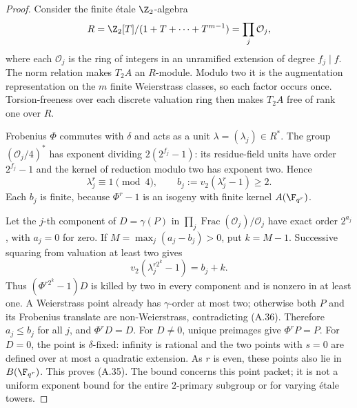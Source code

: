 \begin{proof}
Consider the finite \'etale $\Z_2$-algebra
\[
 R=\Z_2[T]/(1+T+\cdots+T^{m-1})
       =\prod_j\mathcal O_j,
\]
where each $\mathcal O_j$ is the ring of integers in
an unramified extension of degree $f_j\mid f$.
The norm relation makes $T_2A$ an $R$-module.
Modulo two it is the augmentation representation on
the $m$ finite Weierstrass classes, so each factor
occurs once. Torsion-freeness over each discrete
valuation ring then makes $T_2A$ free of rank one
over $R$.

Frobenius $\Phi$ commutes with $\delta$ and acts as a
unit $\lambda=(\lambda_j)\in R^*$. The group
$(\mathcal O_j/4)^*$ has exponent dividing
$2(2^{f_j}-1)$: its residue-field units have order
$2^{f_j}-1$ and the kernel of reduction modulo two
has exponent two. Hence
\[
 \lambda_j^r\equiv1\pmod4,
 \qquad b_j:=v_2(\lambda_j^r-1)\ge2.                   \tag{A.37}
\]
Each $b_j$ is finite, because $\Phi^r-1$ is an
isogeny with finite kernel $A(\F_{q^r})$.

Let the $j$-th component of $D=\gamma(P)$ in
$\prod_j\operatorname{Frac}(\mathcal O_j)/\mathcal O_j$
have exact order $2^{a_j}$, with $a_j=0$ for zero.
If $M=\max_j(a_j-b_j)>0$, put $k=M-1$.
Successive squaring from valuation at least two gives
\[
 v_2(\lambda_j^{r2^k}-1)=b_j+k.
\]
Thus $(\Phi^{r2^k}-1)D$ is killed by two in every
component and is nonzero in at least one. A
Weierstrass point already has $\gamma$-order at most
two; otherwise both $P$ and its Frobenius translate
are non-Weierstrass, contradicting (A.36). Therefore
$a_j\le b_j$ for all $j$, and $\Phi^rD=D$.
For $D\ne0$, unique preimages give $\Phi^rP=P$.
For $D=0$, the point is $\delta$-fixed: infinity is
rational and the two points with $s=0$ are defined
over at most a quadratic extension. As $r$ is even,
these points also lie in $B(\F_{q^r})$. This proves
(A.35). The bound concerns this point packet; it
is not a uniform exponent bound for the entire
$2$-primary subgroup or for varying \'etale towers.
\end{proof}

